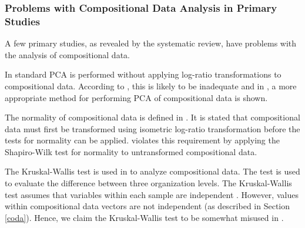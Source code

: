 \subsubsection{\label{codaProblems}Problems with Compositional Data Analysis in Primary Studies}

A few primary studies, as revealed by the systematic review, have problems with the analysis of compositional data.

In \cite{Wohlin2006,Pettersson2008} standard PCA is performed without applying log-ratio transformations to compositional data. According to \cite{Aitchison1983}, this is likely to be inadequate and in \cite{Filzmoser2007}, a more appropriate method for performing PCA of compositional data is shown.

The normality of compositional data is defined in \cite{PawlowskyGlahn2007}. It is stated that compositional data must first be transformed using isometric log-ratio transformation before the tests for normality can be applied. \cite{Jonsson2005a} violates this requirement by applying the Shapiro-Wilk test for normality to untransformed compositional data.

The Kruskal-Wallis test is used in \cite{Jonsson2005a} to analyze compositional data. The test is used to evaluate the difference between three organization levels. The Kruskal-Wallis test assumes that variables within each sample are independent \cite{Kruskal1952a}. However, values within compositional data vectors are not independent (as described in Section \ref{coda}). Hence, we claim the Kruskal-Wallis test to be somewhat misused in \cite{Jonsson2005a}.